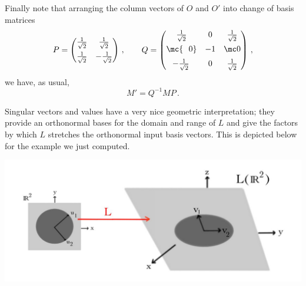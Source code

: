 \begin{example}
Finally note that arranging the column vectors of $O$ and $O'$ into change of basis matrices
\[
P=\begin{pmatrix}
\frac1{\sqrt{2}}&\frac1{\sqrt{2}}\\[2mm]
\frac1{\sqrt{2}}&-\frac1{\sqrt{2}}
\end{pmatrix}\, ,\qquad
Q=
\begin{pmatrix}
\frac1{\sqrt{2}}&0&\frac1{\sqrt{2}}\\[2mm]
\mc {\ \ 0}&-1&\mc 0\\[2mm]
\!-\frac1{\sqrt{2}}&0&\frac1{\sqrt{2}}
\end{pmatrix}\, ,
\]
we have, as usual,
\[
M'=Q^{-1}MP\, .
\]
\end{example}

Singular vectors and values have a very nice geometric interpretation; they provide an orthonormal bases for the domain and range of $L$
and give the factors by which $L$ stretches the orthonormal input basis vectors. This is depicted below for the example we just computed.
\begin{center}
\includegraphics[scale=.27]{singval.jpg}
\end{center} 



